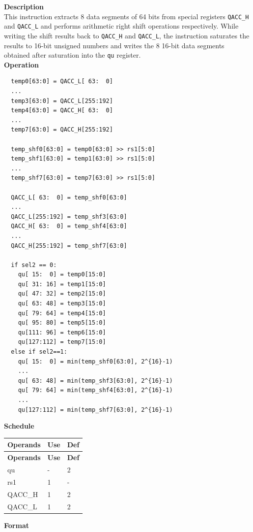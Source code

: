 \textbf{Description}\\
This instruction extracts 8 data segments of 64 bits from special registers \lstinline{QACC_H} and \lstinline{QACC_L} and performs arithmetic right shift operations respectively. While writing the shift results back to \lstinline{QACC_H} and \lstinline{QACC_L}, the instruction saturates the results to 16-bit unsigned numbers and writes the 8 16-bit data segments obtained after saturation into the \lstinline{qu} register.\\
\textbf{Operation}
\begin{lstlisting}
  temp0[63:0] = QACC_L[ 63:  0]
  ...
  temp3[63:0] = QACC_L[255:192]
  temp4[63:0] = QACC_H[ 63:  0]
  ...
  temp7[63:0] = QACC_H[255:192]

  temp_shf0[63:0] = temp0[63:0] >> rs1[5:0]
  temp_shf1[63:0] = temp1[63:0] >> rs1[5:0]
  ...
  temp_shf7[63:0] = temp7[63:0] >> rs1[5:0]

  QACC_L[ 63:  0] = temp_shf0[63:0]
  ...
  QACC_L[255:192] = temp_shf3[63:0]
  QACC_H[ 63:  0] = temp_shf4[63:0]
  ...
  QACC_H[255:192] = temp_shf7[63:0]

  if sel2 == 0:
    qu[ 15:  0] = temp0[15:0]
    qu[ 31: 16] = temp1[15:0]
    qu[ 47: 32] = temp2[15:0]
    qu[ 63: 48] = temp3[15:0]
    qu[ 79: 64] = temp4[15:0]
    qu[ 95: 80] = temp5[15:0]
    qu[111: 96] = temp6[15:0]
    qu[127:112] = temp7[15:0]
  else if sel2==1:
    qu[ 15:  0] = min(temp_shf0[63:0], 2^{16}-1)
    ...
    qu[ 63: 48] = min(temp_shf3[63:0], 2^{16}-1)
    qu[ 79: 64] = min(temp_shf4[63:0], 2^{16}-1)
    ...
    qu[127:112] = min(temp_shf7[63:0], 2^{16}-1)
\end{lstlisting}

\textbf{Schedule}\\
\begin{longtable}[c]{|l|l|l|}
    \hline
    \rowcolor{lightgray}
    \textbf{Operands} & \textbf{Use} & \textbf{Def} \\\hline
    \endfirsthead
    \hline
    \rowcolor{lightgray}
     \textbf{Operands} & \textbf{Use} & \textbf{Def} \\\hline
    \endhead
    \hline
    \endfoot

  qu & - & 2 \\\hline
  rs1 & 1 & - \\\hline
  QACC\_H & 1 & 2 \\\hline
  QACC\_L & 1 & 2

\end{longtable}

\textbf{Format}\\

